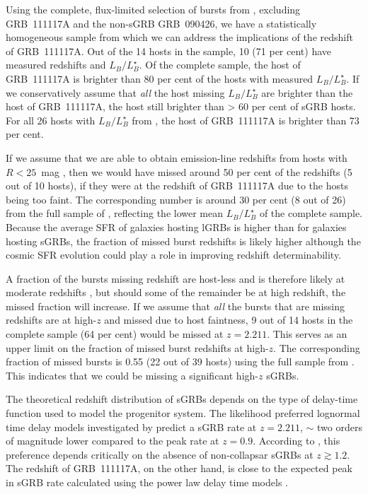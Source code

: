 \documentclass{aa}    %
\begin{document}
Using the complete, flux-limited selection of bursts from \citet{DAvanzo2014a},
excluding GRB~111117A and the non-sGRB GRB~090426, we have a statistically
homogeneous sample from which we can address the implications of the redshift of
GRB~111117A. Out of the 14 hosts in the sample, 10 (71 per cent) have measured
redshifts and $L_B/L^{\star}_{B}$. Of the complete sample, the host of
GRB~111117A  is brighter than 80 per cent of the hosts with measured
$L_B/L^{\star}_{B}$. If we conservatively assume that \textit{all} the host
missing $L_B/L^{\star}_{B}$ are brighter than the host of GRB~111117A, the host
still brighter than > 60 per cent of sGRB hosts. For all 26 hosts with
$L_B/L^{\star}_{B}$ from \citet{Berger2014}, the host of GRB~111117A is brighter
than 73 per cent.

If we assume that we are able to obtain emission-line redshifts from hosts with
$R < 25$~mag \citep{Kruhler2012}, then we would have missed around 50 per cent
of the redshifts (5 out of 10 hosts), if they were at the redshift of
GRB~111117A due to the hosts being too faint. The corresponding number is around
30 per cent (8 out of 26) from the full sample of \citet{Berger2014}, reflecting
the lower mean $L_B/L^{\star}_{B}$ of the complete sample. Because the average
SFR of galaxies hosting lGRBs is higher than for galaxies hosting sGRBs, the
fraction of missed burst redshifts is likely higher although the cosmic SFR
evolution could play a role in improving redshift determinability.

A fraction of the bursts missing redshift are host-less and is therefore likely
at moderate redshifts \citep{Tunnicliffe2014}, but should some of the remainder
be at high redshift, the missed fraction will increase. If we assume that
\textit{all} the bursts that are missing redshifts are at high-$z$ and missed
due to host faintness, 9 out of 14 hosts in the complete sample (64 per cent)
would be missed at $z = 2.211$. This serves as an upper limit on the fraction of
missed burst redshifts at high-$z$. The corresponding fraction of missed bursts
is 0.55 (22 out of 39 hosts) using the full sample from \citet{Berger2014}. This
indicates that we could be missing a significant high-$z$ sGRBs.

The theoretical redshift distribution of sGRBs depends on the type of delay-time
function used to model the progenitor system. The likelihood preferred lognormal
time delay models investigated by \citet{Wanderman2015} predict a sGRB rate at
$z = 2.211$, $\sim$ two orders of magnitude lower compared to the peak rate at
$z = 0.9$. According to \citet{Wanderman2015}, this preference depends
critically on the absence of non-collapsar sGRBs at $z \gtrsim 1.2$. The
redshift of GRB~111117A, on the other hand, is close to the expected peak in
sGRB rate calculated using the power law delay time models \citep{Behroozi2014,
	Wanderman2015}.
\end{document}
